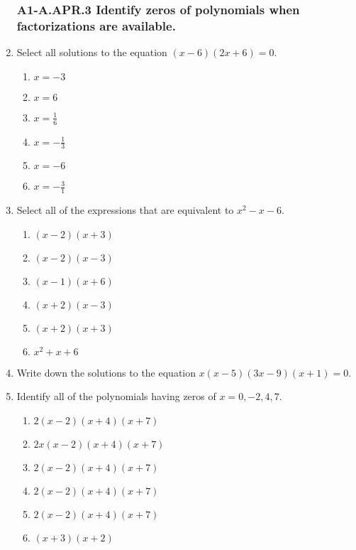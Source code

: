 \documentclass[12pt, twoside]{article}
\begin{document}
\begin{enumerate}
\subsubsection*{A1-A.APR.3 Identify zeros of polynomials when factorizations are available.}
\item Select all solutions to the equation $(x-6)(2x+6)=0$.
    \begin{multicols}{3}
    \begin{enumerate}
        \item $x= -3$
        \item $x= 6$
        \item $x=\frac{1}{6}$
        \item $x= -\frac{1}{3}$
        \item $x= -6$
        \item $x=-\frac{3}{1}$
    \end{enumerate}
    \end{multicols}

\item Select all of the expressions that are equivalent to $x^2-x-6$.
    \begin{multicols}{2}
    \begin{enumerate}
        \item $(x-2)(x+3)$
        \item $(x-2)(x-3)$ 
        \item $(x-1)(x+6)$ 
        \item $(x+2)(x-3)$ 
        \item $(x+2)(x+3)$ 
        \item $x^2+x+6$
    \end{enumerate} 
    \end{multicols}

\item Write down the solutions to the equation $x(x-5)(3x-9)(x+1)=0$. \vspace{2cm}

\item Identify all of the polynomials having zeros of $x = 0, -2, 4, 7$.
\begin{multicols}{2}
    \begin{enumerate}
        \item $2(x-2)(x+4)(x+7)$
        \item $2x(x-2)(x+4)(x+7)$ 
        \item $2(x-2)(x+4)(x+7)$ 
        \item $2(x-2)(x+4)(x+7)$ 
        \item $2(x-2)(x+4)(x+7)$
        \item $(x+3)(x+2)$ 
    \end{enumerate} 
    \end{multicols}


\end{enumerate}
\end{document}
